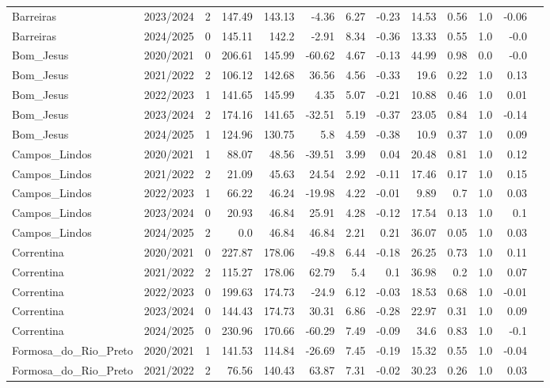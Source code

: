 \begin{longtable}{lrrrrrrrrrrrr}
Barreiras & 2023/2024 & 2 & 147.49 & 143.13 & -4.36 & 6.27 & -0.23 & 14.53 & 0.56 & 1.0 & -0.06 \\ 
Barreiras & 2024/2025 & 0 & 145.11 & 142.2 & -2.91 & 8.34 & -0.36 & 13.33 & 0.55 & 1.0 & -0.0 \\ 
Bom_Jesus & 2020/2021 & 0 & 206.61 & 145.99 & -60.62 & 4.67 & -0.13 & 44.99 & 0.98 & 0.0 & -0.0 \\ 
Bom_Jesus & 2021/2022 & 2 & 106.12 & 142.68 & 36.56 & 4.56 & -0.33 & 19.6 & 0.22 & 1.0 & 0.13 \\ 
Bom_Jesus & 2022/2023 & 1 & 141.65 & 145.99 & 4.35 & 5.07 & -0.21 & 10.88 & 0.46 & 1.0 & 0.01 \\ 
Bom_Jesus & 2023/2024 & 2 & 174.16 & 141.65 & -32.51 & 5.19 & -0.37 & 23.05 & 0.84 & 1.0 & -0.14 \\ 
Bom_Jesus & 2024/2025 & 1 & 124.96 & 130.75 & 5.8 & 4.59 & -0.38 & 10.9 & 0.37 & 1.0 & 0.09 \\ 
Campos_Lindos & 2020/2021 & 1 & 88.07 & 48.56 & -39.51 & 3.99 & 0.04 & 20.48 & 0.81 & 1.0 & 0.12 \\ 
Campos_Lindos & 2021/2022 & 2 & 21.09 & 45.63 & 24.54 & 2.92 & -0.11 & 17.46 & 0.17 & 1.0 & 0.15 \\ 
Campos_Lindos & 2022/2023 & 1 & 66.22 & 46.24 & -19.98 & 4.22 & -0.01 & 9.89 & 0.7 & 1.0 & 0.03 \\ 
Campos_Lindos & 2023/2024 & 0 & 20.93 & 46.84 & 25.91 & 4.28 & -0.12 & 17.54 & 0.13 & 1.0 & 0.1 \\ 
Campos_Lindos & 2024/2025 & 2 & 0.0 & 46.84 & 46.84 & 2.21 & 0.21 & 36.07 & 0.05 & 1.0 & 0.03 \\ 
Correntina & 2020/2021 & 0 & 227.87 & 178.06 & -49.8 & 6.44 & -0.18 & 26.25 & 0.73 & 1.0 & 0.11 \\ 
Correntina & 2021/2022 & 2 & 115.27 & 178.06 & 62.79 & 5.4 & 0.1 & 36.98 & 0.2 & 1.0 & 0.07 \\ 
Correntina & 2022/2023 & 0 & 199.63 & 174.73 & -24.9 & 6.12 & -0.03 & 18.53 & 0.68 & 1.0 & -0.01 \\ 
Correntina & 2023/2024 & 0 & 144.43 & 174.73 & 30.31 & 6.86 & -0.28 & 22.97 & 0.31 & 1.0 & 0.09 \\ 
Correntina & 2024/2025 & 0 & 230.96 & 170.66 & -60.29 & 7.49 & -0.09 & 34.6 & 0.83 & 1.0 & -0.1 \\ 
Formosa_do_Rio_Preto & 2020/2021 & 1 & 141.53 & 114.84 & -26.69 & 7.45 & -0.19 & 15.32 & 0.55 & 1.0 & -0.04 \\ 
Formosa_do_Rio_Preto & 2021/2022 & 2 & 76.56 & 140.43 & 63.87 & 7.31 & -0.02 & 30.23 & 0.26 & 1.0 & 0.03 \\ 

\end{longtable}
